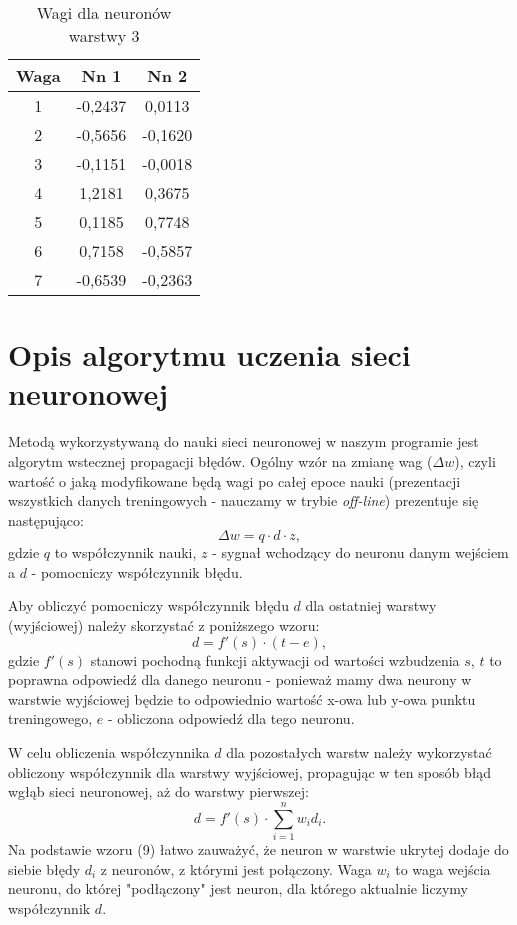 \documentclass{classrep}
\begin{document}
\begin{table}[H]
	\centering
	\begin{tabular}{c c c} 
		\hline
		\textbf{Waga} & \textbf{Nn 1} & \textbf{Nn 2}\\ [0.5ex] 
		\hline
		\hline 
1	&	-0,2437	&	0,0113	\\
2	&	-0,5656	&	-0,1620	\\
3	&	-0,1151	&	-0,0018	\\
4	&	1,2181	&	0,3675	\\
5	&	0,1185	&	0,7748	\\
6	&	0,7158	&	-0,5857	\\
7	&	-0,6539	&	-0,2363	\\
		\hline
	\end{tabular}
	\caption{Wagi dla neuronów warstwy 3}
\end{table}

\section{Opis algorytmu uczenia sieci neuronowej}

Metodą wykorzystywaną do nauki sieci neuronowej w naszym programie jest algorytm wstecznej propagacji błędów. Ogólny wzór na zmianę wag ($\Delta w$), czyli wartość o jaką modyfikowane będą wagi po całej epoce nauki (prezentacji wszystkich danych treningowych - nauczamy w trybie \textit{off-line}) prezentuje się następująco:
\begin{equation}
	\Delta w = q \cdot d \cdot z,
\end{equation}
gdzie $q$ to współczynnik nauki, $z$ - sygnał wchodzący do neuronu danym wejściem a $d$ - pomocniczy współczynnik błędu.\newline

Aby obliczyć pomocniczy współczynnik błędu $d$ dla ostatniej warstwy (wyjściowej) należy skorzystać z poniższego wzoru:
\begin{equation}
	d = f'(s) \cdot (t - e),
\end{equation}
gdzie $f'(s)$ stanowi pochodną funkcji aktywacji od wartości wzbudzenia $s$, $t$ to poprawna odpowiedź dla danego neuronu - ponieważ mamy dwa neurony w warstwie wyjściowej będzie to odpowiednio wartość x-owa lub y-owa punktu treningowego, $e$ - obliczona odpowiedź dla tego neuronu.\newline

W celu obliczenia współczynnika $d$ dla pozostałych warstw należy wykorzystać obliczony współczynnik dla warstwy wyjściowej, propagując w ten sposób błąd wgłąb sieci neuronowej, aż do warstwy pierwszej:
\begin{equation}
	d = f'(s) \cdot \sum_{i=1}^{n} w_i d_i.
\end{equation}
Na podstawie wzoru (9) łatwo zauważyć, że neuron w warstwie ukrytej dodaje do siebie błędy $d_i$ z neuronów, z którymi jest połączony. Waga $w_i$ to waga wejścia neuronu, do której "podłączony" jest neuron, dla którego aktualnie liczymy współczynnik $d$.
\end{document}
